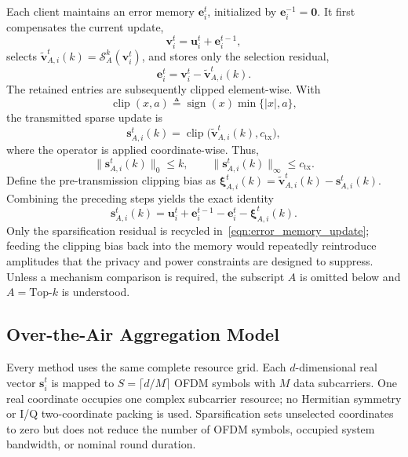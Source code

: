 \documentclass[journal]{IEEEtran}
\begin{document}
Each client maintains an error memory $\mathbf{e}_i^t$, initialized by $\mathbf{e}_i^{-1}=\mathbf{0}$. It first compensates the current update,
{
\begin{equation}
	\mathbf{v}_i^t=\mathbf{u}_i^t+\mathbf{e}_i^{t-1},
\end{equation}
}
selects $\tilde{\mathbf{v}}_{A,i}^t(k)=\mathcal{S}_A^k(\mathbf{v}_i^t)$, and stores only the selection residual,
{
\begin{equation}
	\mathbf{e}_i^t
	=\mathbf{v}_i^t-\tilde{\mathbf{v}}_{A,i}^t(k).
	\label{eqn:error_memory_update}
\end{equation}
}
The retained entries are subsequently clipped element-wise. With
{
\begin{equation}
	\operatorname{clip}(x,a)
	\triangleq\operatorname{sign}(x)\min\{|x|,a\},
\end{equation}
}
the transmitted sparse update is
{
\begin{equation}
	\mathbf{s}_{A,i}^t(k)
	=\operatorname{clip}\big(\tilde{\mathbf{v}}_{A,i}^t(k),c_{\mathrm{tx}}\big),
	\label{eqn:pretransmission_clipping}
\end{equation}
}
where the operator is applied coordinate-wise. Thus,
{
\begin{equation}
	\|\mathbf{s}_{A,i}^t(k)\|_0\le k,
	\qquad
	\|\mathbf{s}_{A,i}^t(k)\|_\infty\le c_{\mathrm{tx}}.
\end{equation}
}
Define the pre-transmission clipping bias as $\boldsymbol{\xi}_{A,i}^t(k)=\tilde{\mathbf{v}}_{A,i}^t(k)-\mathbf{s}_{A,i}^t(k)$. Combining the preceding steps yields the exact identity
{
\begin{equation}
	\mathbf{s}_{A,i}^t(k)
	=\mathbf{u}_i^t+\mathbf{e}_i^{t-1}-\mathbf{e}_i^t
	-\boldsymbol{\xi}_{A,i}^t(k).
	\label{eqn:transmit_decomposition}
\end{equation}
}
Only the sparsification residual is recycled in~\eqref{eqn:error_memory_update}; feeding the clipping bias back into the memory would repeatedly reintroduce amplitudes that the privacy and power constraints are designed to suppress. Unless a mechanism comparison is required, the subscript $A$ is omitted below and $A=\mathrm{Top}\text{-}k$ is understood.


\subsection{Over-the-Air Aggregation Model}
Every method uses the same complete resource grid. Each $d$-dimensional real vector $\mathbf s_i^t$ is mapped to $S=\lceil d/M\rceil$ OFDM symbols with $M$ data subcarriers. One real coordinate occupies one complex subcarrier resource; no Hermitian symmetry or I/Q two-coordinate packing is used. Sparsification sets unselected coordinates to zero but does not reduce the number of OFDM symbols, occupied system bandwidth, or nominal round duration.
\end{document}
